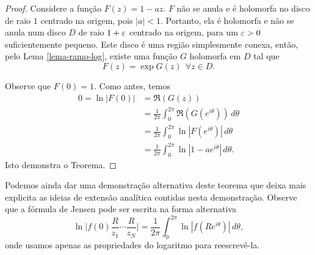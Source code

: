 \begin{proof}
        Considere a função $F(z) = 1 - az$. $F$ não se anula e é holomorfa no 
        disco de raio $1$ centrado na origem, pois $|a| < 1$. Portanto, ela é
        holomorfa e não se anula num disco $D$ de raio $1 + \varepsilon$ centrado na origem,
        para um $\varepsilon > 0$ suficientemente pequeno. Este disco é uma região simplesmente
        conexa, então, pelo Lema \ref{lema-ramo-log}, existe uma função $G$ holomorfa
        em $D$ tal que 
        \begin{equation*}
            F(z) = \exp G(z) \ \ \forall z \in D.
        \end{equation*}
        
        Observe que $F(0) = 1$. Como antes, temos
        \begin{align*}
             0 = \ln{|F(0)|} &= \Re{(G(z))}\\
                &= \frac{1}{2\pi} \int_{0}^{2\pi}\Re{(G(e^{i\theta}))} \, d\theta \\
                &= \frac{1}{2\pi} \int_{0}^{2\pi}\ln{|F(e^{i\theta})|} \, d\theta \\
                &= \frac{1}{2\pi} \int_{0}^{2\pi}\ln{|1 - ae^{i\theta}|} \, d\theta .
        \end{align*}
        Isto demonstra o Teorema.
    \end{proof}
    
    Podemos ainda dar uma demonstração alternativa deste teorema que deixa mais explicita as ideias de extensão analítica contidas nesta demonstração. Observe que a fórmula de Jensen pode ser escrita na forma alternativa
    \begin{equation*}
        \ln{\Big |f(0) \frac{R}{z_1}\cdots\frac{R}{z_N}\Big |} 
        = \frac{1}{2\pi}\int_{0}^{2\pi}\ln{|f(Re^{i\theta})|} \, d\theta, 
    \end{equation*}
    onde usamos apenas as propriedades do logaritmo para reescrevê-la.
    
